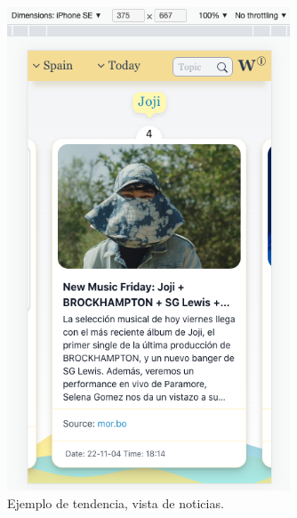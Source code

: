 \begin{figure}[H]
    \centering
    \myfloatalign
    \includegraphics[width=0.75\textwidth]{gfx/ejemplo5.png}
    \caption[Ejemplo de tendencia, vista de noticias]{Ejemplo de tendencia, vista de noticias.}\label{gfx:ejemplo5}
\end{figure}

